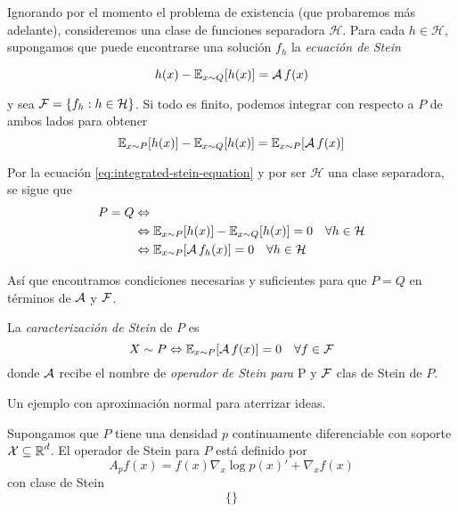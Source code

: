 \documentclass[main.tex]{subfiles}
\begin{document}
Ignorando por el momento el problema de existencia (que probaremos más adelante), consideremos una clase de funciones separadora $\mathcal{H}$. Para cada $h \in \mathcal{H}$, supongamos que puede encontrarse una solución $f_h$ la \textit{ecuación de Stein}

\begin{equation}\label{eq:stein-equation}
    h(x) - \operatorname{\mathbb{E}}_{x\sim Q}[h(x)] = \operatorname{\mathcal{A}} f(x)
\end{equation}

y sea $\operatorname{\mathcal{F}} = \{f_h: h \in \mathcal{H}\}$. Si todo es finito, podemos integrar con respecto a $P$ de ambos lados para obtener
\begin{equation}\label{eq:integrated-stein-equation}
    \operatorname{\mathbb{E}}_{x\sim P}[h(x)] - \operatorname{\mathbb{E}}_{x\sim Q}[h(x)] = \operatorname{\mathbb{E}}_{x\sim P}[\operatorname{\mathcal{A}} f(x)]
\end{equation}

Por la ecuación \eqref{eq:integrated-stein-equation} y por ser $\mathcal{H}$ una clase separadora, se sigue que 
\begin{align*}
    P = Q &\Leftrightarrow \\
    &\Leftrightarrow \operatorname{\mathbb{E}}_{x\sim P}[h(x)] - \operatorname{\mathbb{E}}_{x\sim Q}[h(x)] = 0 \quad \forall h \in \mathcal{H}  \\
    &\Leftrightarrow \operatorname{\mathbb{E}}_{x\sim P}[\operatorname{\mathcal{A}} f_h(x)]= 0 \quad \forall h \in \mathcal{H}
\end{align*}

Así que encontramos condiciones necesarias y suficientes para que $P=Q$ en términos de $\operatorname{\mathcal{A}}$ y $\operatorname{\mathcal{F}}$. 

\begin{definition}
    La \textit{caracterización de Stein} de $P$ es
    \begin{equation*}
        X\sim P \Leftrightarrow \operatorname{\mathbb{E}}_{x\sim P}[\operatorname{\mathcal{A}} f(x)]= 0 \quad \forall f \in \operatorname{\mathcal{F}}
    \end{equation*}
    donde $\operatorname{\mathcal{A}}$ recibe el nombre de \textit{operador de Stein para } P y $\operatorname{\mathcal{F}}$ {clas de Stein} de $P$.
\end{definition}

\begin{example}
    Un ejemplo con aproximación normal para aterrizar ideas.
\end{example}

\begin{theorem}
    Supongamos que $P$ tiene una densidad $p$ continuamente diferenciable con soporte $\operatorname{\mathcal{X}} \subseteq \operatorname{\mathbb{R}}^d$. El operador de Stein para $P$ está definido por
    \begin{equation*}
        A_p f(x) = f(x)\nabla_x\log p(x)' + \nabla_xf(x) 
    \end{equation*}
    con clase de Stein
    \begin{equation*}
        \{\}
    \end{equation*}
\end{theorem}
\end{document}
